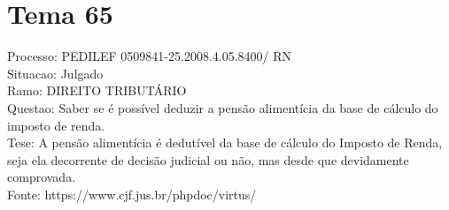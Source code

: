 \documentclass[12pt]{article}
\begin{document}
\section*{Tema 65}
Processo: PEDILEF 0509841-25.2008.4.05.8400/ RN\\
Situacao: Julgado\\
Ramo: DIREITO TRIBUTÁRIO\\
Questao: Saber se é possível deduzir a pensão alimentícia da base de cálculo do imposto de renda.\\
Tese: A pensão alimentícia é dedutível da base de cálculo do Imposto de Renda, seja ela decorrente de decisão judicial ou não, mas desde que devidamente comprovada.\\
Fonte: https://www.cjf.jus.br/phpdoc/virtus/
\end{document}
